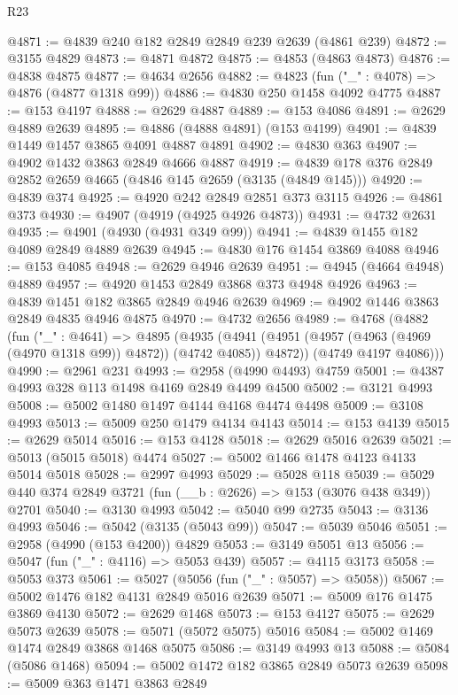\begin{lexlean}{R23}
\begin{coremodule}
@4871 := @4839 @240 @182 @2849 @2849 @239 @2639 (@4861 @239)
@4872 := @3155 @4829
@4873 := @4871 @4872
@4875 := @4853 (@4863 @4873)
@4876 := @4838 @4875
@4877 := @4634 @2656
@4882 := @4823 (fun ("_" : @4078) => @4876 (@4877 @1318 @99))
@4886 := @4830 @250 @1458 @4092 @4775
@4887 := @153 @4197
@4888 := @2629 @4887
@4889 := @153 @4086
@4891 := @2629 @4889 @2639
@4895 := @4886 (@4888 @4891) (@153 @4199)
@4901 := @4839 @1449 @1457 @3865 @4091 @4887 @4891
@4902 := @4830 @363
@4907 := @4902 @1432 @3863 @2849 @4666 @4887
@4919 := @4839 @178 @376 @2849 @2852 @2659 @4665 (@4846 @145 @2659 (@3135 (@4849 @145)))
@4920 := @4839 @374
@4925 := @4920 @242 @2849 @2851 @373 @3115
@4926 := @4861 @373
@4930 := @4907 (@4919 (@4925 @4926 @4873))
@4931 := @4732 @2631
@4935 := @4901 (@4930 (@4931 @349 @99))
@4941 := @4839 @1455 @182 @4089 @2849 @4889 @2639
@4945 := @4830 @176 @1454 @3869 @4088
@4946 := @153 @4085
@4948 := @2629 @4946 @2639
@4951 := @4945 (@4664 @4948) @4889
@4957 := @4920 @1453 @2849 @3868 @373 @4948 @4926
@4963 := @4839 @1451 @182 @3865 @2849 @4946 @2639
@4969 := @4902 @1446 @3863 @2849 @4835 @4946 @4875
@4970 := @4732 @2656
@4989 := @4768
    (@4882
      (fun ("_" : @4641) =>
      @4895
        (@4935 (@4941 (@4951 (@4957 (@4963 (@4969 (@4970 @1318 @99)) @4872)) (@4742 @4085)) @4872))
        (@4749 @4197 @4086)))
@4990 := @2961 @231
@4993 := @2958 (@4990 @4493) @4759
@5001 := @4387 @4993 @328 @113 @1498 @4169 @2849 @4499 @4500
@5002 := @3121 @4993
@5008 := @5002 @1480 @1497 @4144 @4168 @4474 @4498
@5009 := @3108 @4993
@5013 := @5009 @250 @1479 @4134 @4143
@5014 := @153 @4139
@5015 := @2629 @5014
@5016 := @153 @4128
@5018 := @2629 @5016 @2639
@5021 := @5013 (@5015 @5018) @4474
@5027 := @5002 @1466 @1478 @4123 @4133 @5014 @5018
@5028 := @2997 @4993
@5029 := @5028 @118
@5039 := @5029 @440 @374 @2849 @3721 (fun (__b : @2626) => @153 (@3076 @438 @349)) @2701
@5040 := @3130 @4993
@5042 := @5040 @99 @2735
@5043 := @3136 @4993
@5046 := @5042 (@3135 (@5043 @99))
@5047 := @5039 @5046
@5051 := @2958 (@4990 (@153 @4200)) @4829
@5053 := @3149 @5051 @13
@5056 := @5047 (fun ("_" : @4116) => @5053 @439)
@5057 := @4115 @3173
@5058 := @5053 @373
@5061 := @5027 (@5056 (fun ("_" : @5057) => @5058))
@5067 := @5002 @1476 @182 @4131 @2849 @5016 @2639
@5071 := @5009 @176 @1475 @3869 @4130
@5072 := @2629 @1468
@5073 := @153 @4127
@5075 := @2629 @5073 @2639
@5078 := @5071 (@5072 @5075) @5016
@5084 := @5002 @1469 @1474 @2849 @3868 @1468 @5075
@5086 := @3149 @4993 @13
@5088 := @5084 (@5086 @1468)
@5094 := @5002 @1472 @182 @3865 @2849 @5073 @2639
@5098 := @5009 @363 @1471 @3863 @2849

\end{coremodule}
\end{lexlean}
